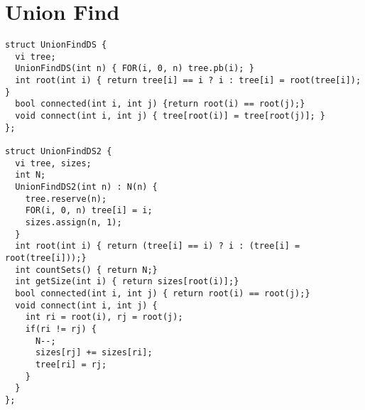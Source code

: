 \documentclass[11pt, oneside]{article}
\begin{document}
\section{Union Find}
\begin{lstlisting}
struct UnionFindDS {
  vi tree;
  UnionFindDS(int n) { FOR(i, 0, n) tree.pb(i); }
  int root(int i) { return tree[i] == i ? i : tree[i] = root(tree[i]); }
  bool connected(int i, int j) {return root(i) == root(j);}
  void connect(int i, int j) { tree[root(i)] = tree[root(j)]; }
};

struct UnionFindDS2 {
  vi tree, sizes;
  int N;
  UnionFindDS2(int n) : N(n) {
    tree.reserve(n);
    FOR(i, 0, n) tree[i] = i;
    sizes.assign(n, 1);
  }
  int root(int i) { return (tree[i] == i) ? i : (tree[i] = root(tree[i]));}
  int countSets() { return N;}
  int getSize(int i) { return sizes[root(i)];}
  bool connected(int i, int j) { return root(i) == root(j);}
  void connect(int i, int j) {
    int ri = root(i), rj = root(j);
    if(ri != rj) {
      N--;
      sizes[rj] += sizes[ri];
      tree[ri] = rj;
    }
  }
};

\end{lstlisting}
\end{document}

